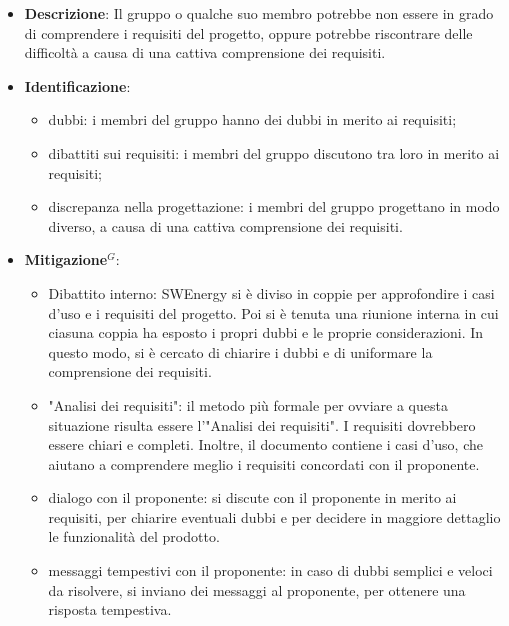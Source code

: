 \label{risk:comprensione dei requisiti carente}
\begin{itemize}
	\item \textbf{Descrizione}:
	      Il gruppo o qualche suo membro potrebbe non essere in grado di
	      comprendere i requisiti del progetto, oppure potrebbe riscontrare
	      delle difficoltà a causa di una cattiva comprensione dei requisiti.
	\item \textbf{Identificazione}:
	      \begin{itemize}
		      \item dubbi: i membri del gruppo hanno dei dubbi in merito ai
		            requisiti;

		      \item dibattiti sui requisiti: i membri del gruppo
		            discutono tra loro in merito ai requisiti;

		      \item discrepanza nella progettazione: i membri del gruppo
		            progettano in modo diverso, a causa di una cattiva
		            comprensione dei requisiti.
	      \end{itemize}
	\item \textbf{\gls{Mitigazione}$^G$}:
	      \begin{itemize}
		      \item Dibattito interno: SWEnergy si è diviso in coppie per
		            approfondire i casi d'uso e i requisiti del progetto. Poi si
		            è tenuta una riunione interna in cui ciasuna coppia ha
		            esposto i propri dubbi e le proprie considerazioni. In
		            questo modo, si è cercato di chiarire i dubbi e di
		            uniformare la comprensione dei requisiti.

		      \item "Analisi dei requisiti": il metodo più formale per ovviare a
		            questa situazione risulta essere l'"Analisi dei requisiti".
		            I requisiti dovrebbero essere chiari e completi. Inoltre,
		            il documento contiene i casi d'uso, che aiutano a
		            comprendere meglio i requisiti concordati con il proponente.

		      \item dialogo con il proponente: si discute con il proponente in
		            merito ai requisiti, per chiarire eventuali dubbi e per
		            decidere in maggiore dettaglio le funzionalità del prodotto.

		      \item messaggi tempestivi con il proponente: in caso di dubbi
		            semplici e veloci da risolvere, si inviano dei messaggi al
		            proponente, per ottenere una risposta tempestiva.
	      \end{itemize}
\end{itemize}
